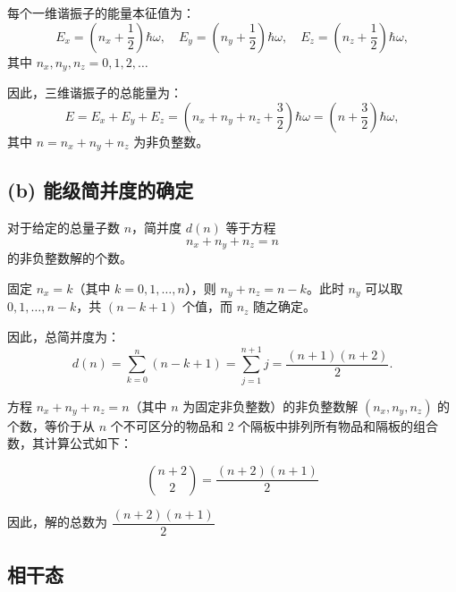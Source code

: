 每个一维谐振子的能量本征值为：
\[
E_x = \left(n_x + \frac{1}{2}\right)\hbar\omega, \quad 
E_y = \left(n_y + \frac{1}{2}\right)\hbar\omega, \quad 
E_z = \left(n_z + \frac{1}{2}\right)\hbar\omega,
\]
其中 \(n_x, n_y, n_z = 0, 1, 2, \dots\)

因此，三维谐振子的总能量为：
\[
E = E_x + E_y + E_z = \left(n_x + n_y + n_z + \frac{3}{2}\right)\hbar\omega = \left(n + \frac{3}{2}\right)\hbar\omega,
\]
其中 \(n = n_x + n_y + n_z\) 为非负整数。

\subsection*{(b) 能级简并度的确定}

对于给定的总量子数 \(n\)，简并度 \(d(n)\) 等于方程
\[
n_x + n_y + n_z = n
\]
的非负整数解的个数。

固定 \(n_x = k\)（其中 \(k = 0, 1, \dots, n\)），则 \(n_y + n_z = n - k\)。此时 \(n_y\) 可以取 \(0, 1, \dots, n-k\)，共 \((n - k + 1)\) 个值，而 \(n_z\) 随之确定。

因此，总简并度为：
\[
d(n) = \sum_{k=0}^{n} (n - k + 1) = \sum_{j=1}^{n+1} j = \frac{(n+1)(n+2)}{2}.
\]

方程 \(n_x + n_y + n_z = n\)（其中 \(n\) 为固定非负整数）的非负整数解 \((n_x, n_y, n_z)\) 的个数，等价于从 \(n\) 个不可区分的物品和 \(2\) 个隔板中排列所有物品和隔板的组合数，其计算公式如下：

\[
\binom{n+2}{2} = \frac{(n+2)(n+1)}{2}
\]

因此，解的总数为 \(\boxed{\dfrac{(n+2)(n+1)}{2}}\)
\subsection{相干态}

